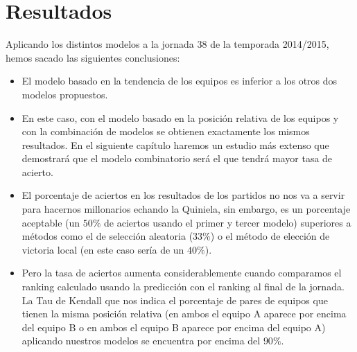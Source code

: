 \section{Resultados}
Aplicando los distintos modelos a la jornada 38 de la temporada 2014/2015, hemos sacado las siguientes conclusiones:
\begin{itemize}
	\item El modelo basado en la tendencia de los equipos es inferior a los otros dos modelos propuestos.
	\item En este caso, con el modelo basado en la posición relativa de los equipos y con la combinación de modelos se obtienen exactamente los mismos resultados. En el siguiente capítulo haremos un estudio más extenso que demostrará que el modelo combinatorio será el que tendrá mayor tasa de acierto.
	\item El porcentaje de aciertos en los resultados de los partidos no nos va a servir para hacernos millonarios echando la Quiniela, sin embargo, es un porcentaje aceptable (un $50\%$ de aciertos usando el primer y tercer modelo) superiores a métodos como el de selección aleatoria ($33 \%$) o el método de elección de victoria local (en este caso sería de un $40\%$).
	\item Pero la tasa de aciertos aumenta considerablemente cuando comparamos el ranking calculado usando la predicción con el ranking al final de la jornada. La Tau de Kendall que nos indica el porcentaje de pares de equipos que tienen la misma posición relativa (en ambos el equipo A aparece por encima del equipo B o en ambos el equipo B aparece por encima del equipo A) aplicando nuestros modelos se encuentra por encima del $90\%$.
\end{itemize}
 
